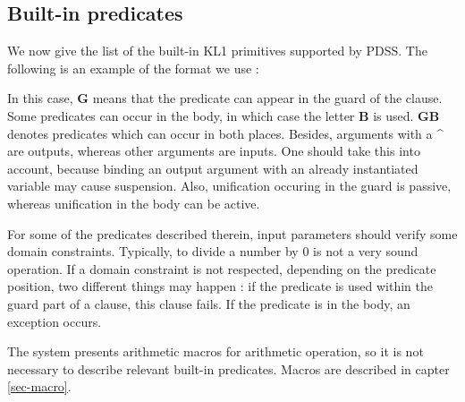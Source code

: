 \subsection{Built-in predicates}
\label{sec-builtin}

We now give the list of the built-in KL1 primitives supported by PDSS.
The following is an example of the format we use :
\vspace{2ex}

\hspace*{10em}
\vspace{2ex}

In this case, {\bf G} means that the predicate can appear in the guard of the
clause. Some predicates can occur in the body, in which case the letter
{\bf B} is used. {\bf GB} denotes predicates which can occur in both places.
Besides, arguments with a {\bf ^} are outputs, whereas other arguments are
inputs. One should take this into account, because binding an output argument
with an already instantiated variable may cause suspension. Also, unification
occuring in the guard is passive, whereas unification in the body can be
active. 

For some of the predicates described therein, input parameters should verify
some domain constraints. Typically, to divide a number by 0 is not a very
sound operation. If a domain constraint is not respected,
depending on the predicate position, two different things may happen : 
if the predicate is used within the guard part of a clause, 
this clause fails. If the predicate is in the body, an exception occurs.

The system presents arithmetic macros for arithmetic operation, so
it is not necessary to describe relevant built-in predicates.
Macros are described in capter \ref{sec-macro}.
\vspace{1ex}


